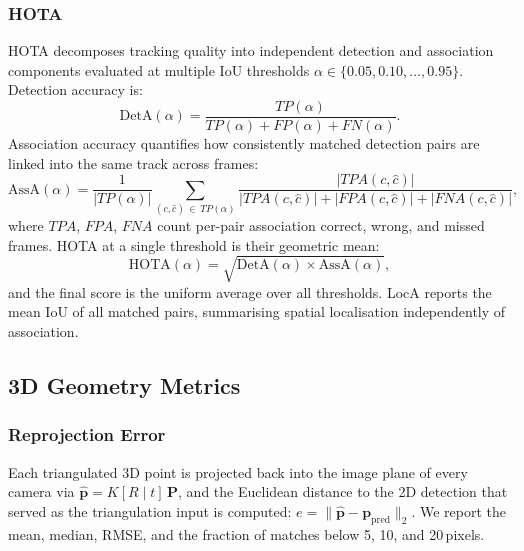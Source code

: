 \subsubsection{HOTA}
HOTA \cite{hota} decomposes tracking quality into independent detection and
association components evaluated at multiple IoU thresholds
$\alpha \in \{0.05, 0.10, \ldots, 0.95\}$.
Detection accuracy is:
\begin{equation}
  \mathrm{DetA}(\alpha) = \frac{TP(\alpha)}{TP(\alpha)+FP(\alpha)+FN(\alpha)}.
\end{equation}
Association accuracy quantifies how consistently matched detection pairs are linked
into the same track across frames:
\begin{equation}
  \mathrm{AssA}(\alpha) = \frac{1}{|TP(\alpha)|}
  \sum_{(c,\hat{c})\,\in\,TP(\alpha)}
  \frac{|TPA(c,\hat{c})|}{|TPA(c,\hat{c})|+|FPA(c,\hat{c})|+|FNA(c,\hat{c})|},
\end{equation}
where $TPA$, $FPA$, $FNA$ count per-pair association correct, wrong, and missed
frames.
HOTA at a single threshold is their geometric mean:
\begin{equation}
  \mathrm{HOTA}(\alpha) = \sqrt{\mathrm{DetA}(\alpha)\times\mathrm{AssA}(\alpha)},
\end{equation}
and the final score is the uniform average over all thresholds.
LocA reports the mean IoU of all matched pairs, summarising spatial localisation
independently of association.

\subsection{3D Geometry Metrics}

\subsubsection{Reprojection Error}
Each triangulated 3D point is projected back into the image plane of every camera
via $\hat{\mathbf{p}} = K[R\mid t]\,\mathbf{P}$, and the Euclidean distance to the
2D detection that served as the triangulation input is computed:
$e = \|\hat{\mathbf{p}} - \mathbf{p}_\mathrm{pred}\|_2$.
We report the mean, median, RMSE, and the fraction of matches below 5, 10, and
20\,pixels.

